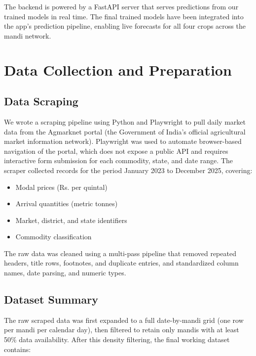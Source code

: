 \documentclass[conference]{IEEEtran}
\begin{document}
The backend is powered by a FastAPI server that serves predictions from our trained models in real time. The final trained models have been integrated into the app's prediction pipeline, enabling live forecasts for all four crops across the mandi network.

\section{Data Collection and Preparation}

\subsection{Data Scraping}

We wrote a scraping pipeline using Python and Playwright to pull daily market data from the Agmarknet portal (the Government of India's official agricultural market information network). Playwright was used to automate browser-based navigation of the portal, which does not expose a public API and requires interactive form submission for each commodity, state, and date range. The scraper collected records for the period January 2023 to December 2025, covering:

\begin{itemize}
\item Modal prices (Rs. per quintal)
\item Arrival quantities (metric tonnes)
\item Market, district, and state identifiers
\item Commodity classification
\end{itemize}

The raw data was cleaned using a multi-pass pipeline that removed repeated headers, title rows, footnotes, and duplicate entries, and standardized column names, date parsing, and numeric types.

\subsection{Dataset Summary}

The raw scraped data was first expanded to a full date-by-mandi grid (one row per mandi per calendar day), then filtered to retain only mandis with at least 50\% data availability. After this density filtering, the final working dataset contains:
\end{document}
